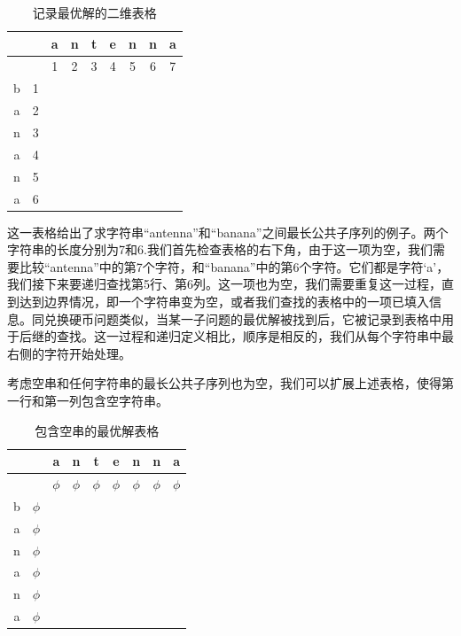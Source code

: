 \documentclass[b5paper]{ctexart}
\begin{document}
\begin{table}[htbp]
\centering
\begin{tabular}{|c|c|c|c|c|c|c|c|c|}
\hline
 & & a & n & t & e & n & n & a \\
\hline
 & & 1 & 2 & 3 & 4 & 5 & 6 & 7 \\
\hline
b & 1 & & & & & & & \\
\hline
a & 2 & & & & & & & \\
\hline
n & 3 & & & & & & & \\
\hline
a & 4 & & & & & & & \\
\hline
n & 5 & & & & & & & \\
\hline
a & 6 & & & & & & & \\
\hline
\end{tabular}
\caption{记录最优解的二维表格} %
\end{table}

这一表格给出了求字符串“antenna”和“banana”之间最长公共子序列的例子。两个字符串的长度分别为7和6.我们首先检查表格的右下角，由于这一项为空，我们需要比较“antenna”中的第7个字符，和“banana”中的第6个字符。它们都是字符‘a’，我们接下来要递归查找第5行、第6列。这一项也为空，我们需要重复这一过程，直到达到边界情况，即一个字符串变为空，或者我们查找的表格中的一项已填入信息。同兑换硬币问题类似，当某一子问题的最优解被找到后，它被记录到表格中用于后继的查找。这一过程和递归定义相比，顺序是相反的，我们从每个字符串中最右侧的字符开始处理。

考虑空串和任何字符串的最长公共子序列也为空，我们可以扩展上述表格，使得第一行和第一列包含空字符串。

\begin{table}[htbp]
\centering
\begin{tabular}{|c|c|c|c|c|c|c|c|c|}
\hline
 & & a & n & t & e & n & n & a \\
\hline
 & & $\phi$ & $\phi$ & $\phi$ & $\phi$ & $\phi$ & $\phi$ & $\phi$ \\
\hline
b & $\phi$ & & & & & & & \\
\hline
a & $\phi$ & & & & & & & \\
\hline
n & $\phi$ & & & & & & & \\
\hline
a & $\phi$ & & & & & & & \\
\hline
n & $\phi$ & & & & & & & \\
\hline
a & $\phi$ & & & & & & & \\
\hline
\end{tabular}
\caption{包含空串的最优解表格}
\end{table}
\end{document}
